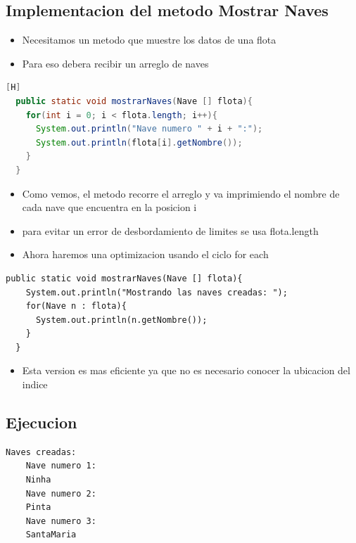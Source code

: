 \documentclass{article}
\begin{document}
	\subsection{Implementacion del metodo Mostrar Naves}
	\begin{itemize}	
		\item Necesitamos un metodo que muestre los datos de una flota
		\item Para eso debera recibir un arreglo de naves
	\end{itemize}	
		
	\begin{lstlisting}[language=java,caption={Metodo mostrarNaves}][H]
  public static void mostrarNaves(Nave [] flota){
    for(int i = 0; i < flota.length; i++){
      System.out.println("Nave numero " + i + ":");
      System.out.println(flota[i].getNombre());
    }
  }
	\end{lstlisting}
\begin{itemize}
    \item Como vemos, el metodo recorre el arreglo y va imprimiendo el nombre de cada nave que encuentra en la posicion i
    \item para evitar un error de desbordamiento de limites se usa flota.length
    \item Ahora haremos una optimizacion usando el ciclo for each
\end{itemize}
\begin{lstlisting}[languaje=java, caption={Optimizacion del metodo mostrarNaves}]
  public static void mostrarNaves(Nave [] flota){
    System.out.println("Mostrando las naves creadas: ");
    for(Nave n : flota){
      System.out.println(n.getNombre());
    } 
  }    
\end{lstlisting}
\begin{itemize}
    \item Esta version es mas eficiente ya que no es necesario conocer la ubicacion del indice
\end{itemize}

    \subsection{Ejecucion}
    \begin{lstlisting}[language=bash, caption={Ejecucion del codigo}]
    Naves creadas:
    Nave numero 1:
    Ninha
    Nave numero 2:
    Pinta
    Nave numero 3:
    SantaMaria

    \end{lstlisting}
\end{document}
